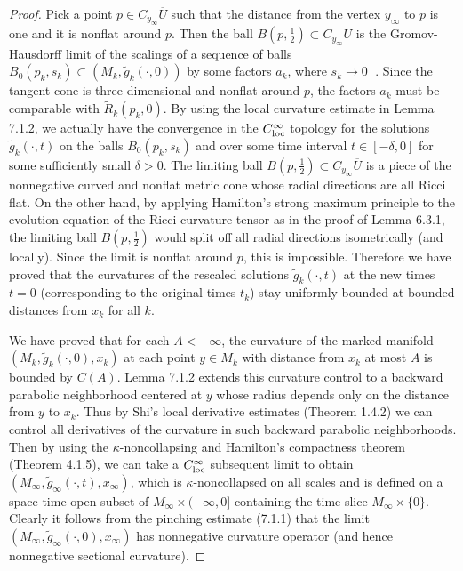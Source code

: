 \begin{proof}
Pick a point $p\in C_{y_{\infty}}\overline{U}$ such that the
distance from the vertex $y_{\infty}$ to $p$ is one and it is
nonflat around $p$. Then the ball $B(p,\frac{1}{2})\subset
C_{y_{\infty}}\overline{U}$ is the Gromov-Hausdorff limit of the
scalings of a sequence of balls
$B_0(p_k,s_k)\subset(M_k,\tilde{g}_{k}(\cdot,0))$ by some factors
$a_k$, where $s_k\rightarrow 0^+$. Since the tangent cone is
three-dimensional and nonflat around $p$, the factors $a_k$ must
be comparable with $\tilde{R}_k(p_k,0)$. By using the local
curvature estimate in Lemma 7.1.2, we actually have the
convergence in the $C^{\infty}_{\rm loc}$ topology for the
solutions $\tilde{g}_{k}(\cdot,t)$ on the balls $B_0(p_k,s_k)$ and
over some time interval $t\in [-\delta, 0]$ for some sufficiently
small $\delta>0$. The limiting ball $B(p,\frac{1}{2})\subset
C_{y_{\infty}}\overline{U}$ is a piece of the nonnegative curved
and nonflat metric cone whose radial directions are all Ricci
flat. On the other hand, by applying Hamilton's strong maximum
principle to the evolution equation of the Ricci curvature tensor
as in the proof of Lemma 6.3.1, the limiting ball
$B(p,\frac{1}{2})$ would split off all radial directions
isometrically (and locally). Since the limit is nonflat around
$p$, this is impossible. Therefore we have proved that the
curvatures of the rescaled solutions $\tilde{g}_k(\cdot,t)$ at the
new times $t=0$ (corresponding to the original times $t_k$) stay
uniformly bounded at bounded distances from $x_k$ for all $k$.

We have proved that for each $A<+\infty$, the curvature of the
marked manifold $(M_k,\tilde{g}_k(\cdot,0),x_k)$ at each point
$y\in M_k$ with distance from $x_k$ at most $A$ is bounded by
$C(A)$. Lemma 7.1.2 extends this curvature control to a backward
parabolic neighborhood centered at $y$ whose radius depends only
on the distance from $y$ to $x_k$. Thus by Shi's local derivative
estimates (Theorem 1.4.2) we can control all derivatives of the
curvature in such backward parabolic neighborhoods. Then by using
the $\kappa$-noncollapsing and Hamilton's compactness theorem
(Theorem 4.1.5), we can take a $C_{\rm loc}^{\infty}$ subsequent
limit to obtain $(M_{\infty},
\tilde{g}_{\infty}(\cdot,t),x_{\infty})$, which is
$\kappa$-noncollapsed on all scales and is defined on a space-time
open subset of $M_{\infty}\times(-\infty,0]$ containing the time
slice $M_{\infty}\times\{0\}$. Clearly it follows from the
pinching estimate (7.1.1) that the limit $(M_{\infty},
\tilde{g}_{\infty}(\cdot,0),x_{\infty})$ has nonnegative curvature
operator (and hence nonnegative sectional curvature).


\end{proof}
